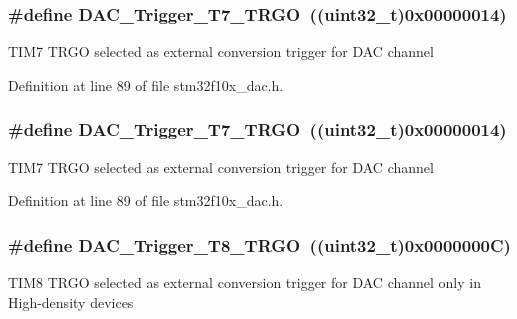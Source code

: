 \subsubsection[{\texorpdfstring{D\+A\+C\+\_\+\+Trigger\+\_\+\+T7\+\_\+\+T\+R\+GO}{DAC_Trigger_T7_TRGO}}]{\setlength{\rightskip}{0pt plus 5cm}\#define D\+A\+C\+\_\+\+Trigger\+\_\+\+T7\+\_\+\+T\+R\+GO~(({\bf uint32\+\_\+t})0x00000014)}\hypertarget{group___d_a_c__trigger__selection_ga9b92d497746be54af46ae4e9c1fc4a6f}{}\label{group___d_a_c__trigger__selection_ga9b92d497746be54af46ae4e9c1fc4a6f}
T\+I\+M7 T\+R\+GO selected as external conversion trigger for D\+AC channel 

Definition at line 89 of file stm32f10x\+\_\+dac.\+h.

\subsubsection[{\texorpdfstring{D\+A\+C\+\_\+\+Trigger\+\_\+\+T7\+\_\+\+T\+R\+GO}{DAC_Trigger_T7_TRGO}}]{\setlength{\rightskip}{0pt plus 5cm}\#define D\+A\+C\+\_\+\+Trigger\+\_\+\+T7\+\_\+\+T\+R\+GO~(({\bf uint32\+\_\+t})0x00000014)}\hypertarget{group___d_a_c__trigger__selection_ga9b92d497746be54af46ae4e9c1fc4a6f}{}\label{group___d_a_c__trigger__selection_ga9b92d497746be54af46ae4e9c1fc4a6f}
T\+I\+M7 T\+R\+GO selected as external conversion trigger for D\+AC channel 

Definition at line 89 of file stm32f10x\+\_\+dac.\+h.

\subsubsection[{\texorpdfstring{D\+A\+C\+\_\+\+Trigger\+\_\+\+T8\+\_\+\+T\+R\+GO}{DAC_Trigger_T8_TRGO}}]{\setlength{\rightskip}{0pt plus 5cm}\#define D\+A\+C\+\_\+\+Trigger\+\_\+\+T8\+\_\+\+T\+R\+GO~(({\bf uint32\+\_\+t})0x0000000\+C)}\hypertarget{group___d_a_c__trigger__selection_ga756700c6621eadb807e21a16966580a0}{}\label{group___d_a_c__trigger__selection_ga756700c6621eadb807e21a16966580a0}
T\+I\+M8 T\+R\+GO selected as external conversion trigger for D\+AC channel only in High-\/density devices 

